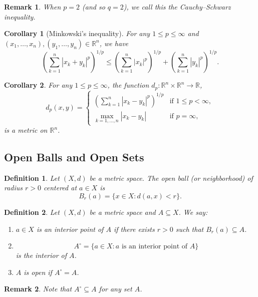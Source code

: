 \documentclass[12pt]{article}
\newtheorem*{remark}{Remark}
\newtheorem{corollary}{Corollary}
\newtheorem{definition}{Definition}
\begin{document}
\begin{remark}
When $p=2$ (and so $q=2$), we call this the Cauchy--Schwarz inequality.
\end{remark}

\begin{corollary}[Minkowski's inequality]
For any $1\le p\le\infty$ and $(x_1,\dots,x_n),(y_1,\dots,y_n)\in\mathbb{R}^n$,
we have
\[
\left(\sum_{k=1}^n |x_k+y_k|^p\right)^{1/p}
\le
\left(\sum_{k=1}^n |x_k|^p\right)^{1/p}
+
\left(\sum_{k=1}^n |y_k|^p\right)^{1/p}.
\]
\end{corollary}

\begin{corollary}
For any $1\le p\le\infty$, the function $d_p:\mathbb{R}^n\times\mathbb{R}^n\to\mathbb{R}$,
\[
d_p(x,y)=
\begin{cases}
\left(\sum_{k=1}^n |x_k-y_k|^p\right)^{1/p} & \text{if } 1\le p<\infty,\\
\max_{k=1,\dots,n} |x_k-y_k| & \text{if } p=\infty,
\end{cases}
\]
is a metric on $\mathbb{R}^n$.
\end{corollary}

\subsection*{Open Balls and Open Sets}
\begin{definition}
Let $(X,d)$ be a metric space. The open ball (or neighborhood) of radius $r>0$
centered at $a\in X$ is
\[
B_r(a)=\{x\in X:d(a,x)<r\}.
\]
\end{definition}

\begin{definition}
Let $(X,d)$ be a metric space and $A\subseteq X$. We say:
\begin{enumerate}[label=\textbf{(\arabic*)}]
  \item $a\in X$ is an interior point of $A$ if there exists $r>0$ such that
  $B_r(a)\subseteq A$.
  \item
  \[
  A^\circ=\{a\in X: a \text{ is an interior point of } A\}
  \]
  is the interior of $A$.
  \item $A$ is open if $A^\circ=A$.
\end{enumerate}
\end{definition}

\begin{remark}
Note that $A^\circ\subseteq A$ for any set $A$.
\end{remark}
\end{document}

